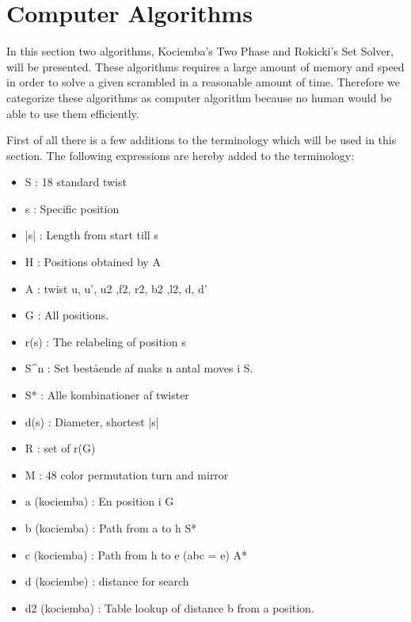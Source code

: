 \section{Computer Algorithms}
\label{sec:computerAlgorithms}
In this section two algorithms, Kociemba's Two Phase and Rokicki's Set Solver, will be presented. These algorithms requires a large amount of memory and speed in order to solve a given scrambled \rubik{} in a reasonable amount of time. Therefore we categorize these algorithms as computer algorithm because no human would be able to use them efficiently.

First of all there is a few additions to the terminology which will be used in this section. The following expressions are hereby added to the terminology:
\begin{itemize}
\item S : 18 standard twist
\item s : Specific position
\item |s| : Length from start till s
\item H : Positions obtained by A
\item A : twist u, u', u2 ,f2, r2, b2 ,l2, d, d'
\item G : All positions. 
\item r(s) : The relabeling of position s
\item S^{n} : Set best\aa{}ende af maks n antal moves i S.
\item S* : Alle kombinationer af twister
\item d(s) : Diameter, shortest |s|
\item R : set of r(G)
\item M : 48 color permutation turn and mirror

\item a (kociemba) : En position i G
\item b (kociemba) : Path from a to h S*
\item c (kociemba) : Path from h to e (abc = e) A*
\item d (kociembe) : distance for search
\item d2 (kociemba) : Table lookup of distance b from a position.

\end{itemize}
	